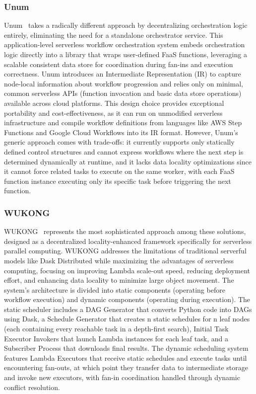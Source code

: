 \documentclass[conference]{IEEEtran}
\begin{document}
\subsubsection{Unum}
Unum~\cite{unum_decentralized_orchestrator} takes a radically different approach by decentralizing orchestration logic entirely, eliminating the need for a standalone orchestrator service. This application-level serverless workflow orchestration system embeds orchestration logic directly into a library that wraps user-defined FaaS functions, leveraging a scalable consistent data store for coordination during fan-ins and execution correctness. Unum introduces an Intermediate Representation (IR) to capture node-local information about workflow progression and relies only on minimal, common serverless APIs (function invocation and basic data store operations) available across cloud platforms. This design choice provides exceptional portability and cost-effectiveness, as it can run on unmodified serverless infrastructure and compile workflow definitions from languages like AWS Step Functions and Google Cloud Workflows into its IR format. However, Unum's generic approach comes with trade-offs: it currently supports only statically defined control structures and cannot express workflows where the next step is determined dynamically at runtime, and it lacks data locality optimizations since it cannot force related tasks to execute on the same worker, with each FaaS function instance executing only its specific task before triggering the next function.

\subsubsection{WUKONG}
WUKONG~\cite{wukong_2} represents the most sophisticated approach among these solutions, designed as a decentralized locality-enhanced framework specifically for serverless parallel computing. WUKONG addresses the limitations of traditional serverful models like Dask Distributed while maximizing the advantages of serverless computing, focusing on improving Lambda scale-out speed, reducing deployment effort, and enhancing data locality to minimize large object movement. The system's architecture is divided into static components (operating before workflow execution) and dynamic components (operating during execution). The static scheduler includes a DAG Generator that converts Python code into DAGs using Dask, a Schedule Generator that creates n static schedules for n leaf nodes (each containing every reachable task in a depth-first search), Initial Task Executor Invokers that launch Lambda instances for each leaf task, and a Subscriber Process that downloads final results. The dynamic scheduling system features Lambda Executors that receive static schedules and execute tasks until encountering fan-outs, at which point they transfer data to intermediate storage and invoke new executors, with fan-in coordination handled through dynamic conflict resolution.
\end{document}
